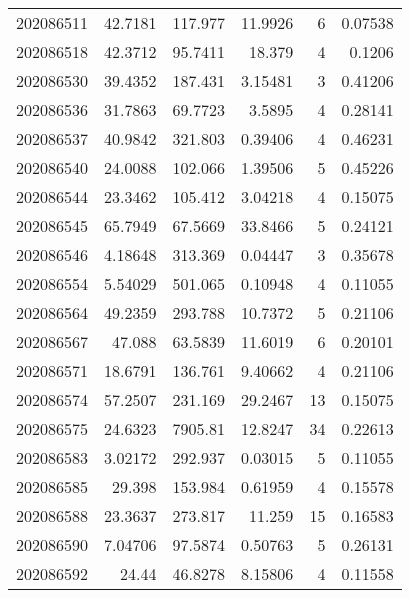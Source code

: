 \begin{tabular}{rrrrrr}
 202086511 &         42.7181  &      117.977  &           11.9926  &           6 & 0.07538 \\
 202086518 &         42.3712  &       95.7411 &           18.379   &           4 & 0.1206  \\
 202086530 &         39.4352  &      187.431  &            3.15481 &           3 & 0.41206 \\
 202086536 &         31.7863  &       69.7723 &            3.5895  &           4 & 0.28141 \\
 202086537 &         40.9842  &      321.803  &            0.39406 &           4 & 0.46231 \\
 202086540 &         24.0088  &      102.066  &            1.39506 &           5 & 0.45226 \\
 202086544 &         23.3462  &      105.412  &            3.04218 &           4 & 0.15075 \\
 202086545 &         65.7949  &       67.5669 &           33.8466  &           5 & 0.24121 \\
 202086546 &          4.18648 &      313.369  &            0.04447 &           3 & 0.35678 \\
 202086554 &          5.54029 &      501.065  &            0.10948 &           4 & 0.11055 \\
 202086564 &         49.2359  &      293.788  &           10.7372  &           5 & 0.21106 \\
 202086567 &         47.088   &       63.5839 &           11.6019  &           6 & 0.20101 \\
 202086571 &         18.6791  &      136.761  &            9.40662 &           4 & 0.21106 \\
 202086574 &         57.2507  &      231.169  &           29.2467  &          13 & 0.15075 \\
 202086575 &         24.6323  &     7905.81   &           12.8247  &          34 & 0.22613 \\
 202086583 &          3.02172 &      292.937  &            0.03015 &           5 & 0.11055 \\
 202086585 &         29.398   &      153.984  &            0.61959 &           4 & 0.15578 \\
 202086588 &         23.3637  &      273.817  &           11.259   &          15 & 0.16583 \\
 202086590 &          7.04706 &       97.5874 &            0.50763 &           5 & 0.26131 \\
 202086592 &         24.44    &       46.8278 &            8.15806 &           4 & 0.11558 \\

\end{tabular}
